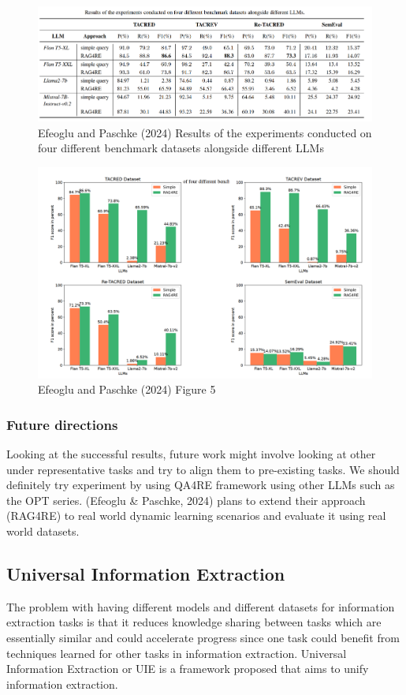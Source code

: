 \documentclass[twocolumn, 11pt]{extarticle}
\begin{document}
\begin{figure}
    \centering
    \includegraphics[width=1\linewidth]{RAG_results.png}
    \caption{Efeoglu and Paschke (2024) Results of the experiments conducted on four different benchmark datasets alongside different LLMs }
    \label{RAG results}
\end{figure}
\begin{figure}
    \centering
    \includegraphics[width=1\linewidth]{RAG_results_2.png}
    \caption{ Efeoglu and Paschke (2024) Figure 5 }
    \label{RAG Results}
\end{figure}


\subsubsection{Future directions}
Looking at the successful results, future work might involve looking at other under representative tasks and try to align them to pre-existing tasks. We should definitely try experiment by using QA4RE framework using other LLMs such as the OPT series. (Efeoglu \& Paschke, 2024) plans to extend their approach (RAG4RE) to real world dynamic learning scenarios and evaluate it using real world datasets. 


\subsection{Universal Information Extraction}
The problem with having different models and different datasets for information extraction tasks is that it reduces knowledge sharing between tasks which are essentially similar and could accelerate progress since one task could benefit from techniques learned for other tasks in information extraction. Universal Information Extraction or UIE is a framework proposed that aims to unify information extraction.
\end{document}
